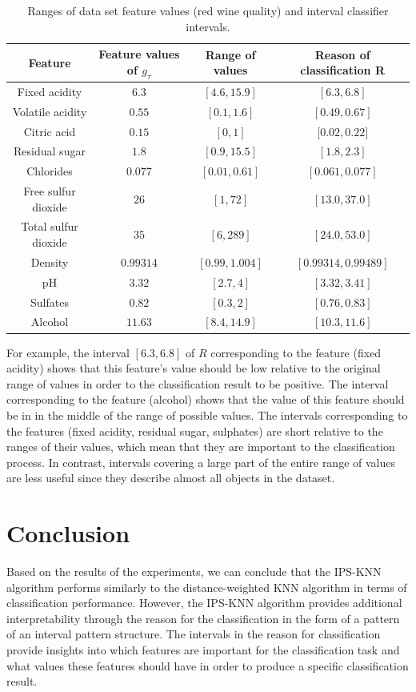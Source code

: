 \documentclass[
]{ceurart}
\begin{document}
\begin{table}
\centering
    \caption{Ranges of data set feature values (red wine quality) and interval classifier intervals.}
    \label{table:example}
    \begin{tabular}{cccc}
    \toprule
     \textbf{Feature} & \textbf{Feature values of $g_\tau$} & \textbf{Range of values} & \textbf{Reason of classification R} \\
    \midrule
    Fixed acidity & $6.3$ & $[4.6, 15.9]$ & $[6.3, 6.8]$\\
    Volatile acidity & $0.55$ & $[0.1, 1.6]$ & $[0.49, 0.67]$\\
    Citric acid & $0.15$ & $[0, 1]$ & [$0.02, 0.22]$\\
    Residual sugar & $1.8$ & $[0.9, 15.5]$ & $[1.8, 2.3]$\\
    Chlorides & $0.077$ & $[0.01, 0.61]$ & $[0.061, 0.077]$\\
    Free sulfur dioxide & $26$ & $[1, 72]$ & $[13.0, 37.0]$\\
    Total sulfur dioxide & $35$ & $[6, 289]$ & $[24.0, 53.0]$\\
    Density & $0.99314$ & $[0.99, 1.004]$ & $[0.99314, 0.99489]$\\
    pH & $3.32$ & $[2.7, 4]$ & $[3.32, 3.41]$\\
    Sulfates & $0.82$ & $[0.3, 2]$ & $[0.76, 0.83]$\\
    Alcohol & $11.63$ & $[8.4, 14.9]$ & $[10.3, 11.6]$\\
    \bottomrule
\end{tabular}
\end{table}

For example, the interval $[6.3, 6.8]$ of $R$ corresponding to the feature (fixed acidity) shows that this feature's value should be low relative to the original range of values in order to the classification result to be positive. The interval corresponding to the feature (alcohol) shows that the value of this feature should be in in the middle of the range of possible values. The intervals corresponding to the features (fixed acidity, residual sugar, sulphates) are short relative to the ranges of their values, which mean that they are important to the classification process. In contrast, intervals covering a large part of the entire range of values are less useful since they describe almost all objects in the dataset.

\section{Conclusion}
Based on the results of the experiments, we can conclude that the IPS-KNN algorithm performs similarly to the distance-weighted KNN algorithm in terms of classification performance. However, the IPS-KNN algorithm provides additional interpretability through the reason for the classification in the form of a pattern of an interval pattern structure. The intervals in the reason for classification provide insights into which features are important for the classification task and what values these features should have in order to produce a specific classification result.
\end{document}
